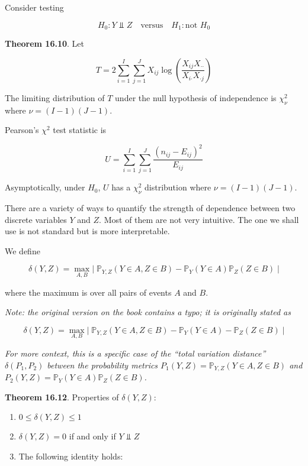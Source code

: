 Consider testing

\[
H_{0}: Y \text{ ⫫ } Z
\quad \text{versus} \quad
H_{1}: \text{not } H_{0}
\]

\textbf{Theorem 16.10}. Let

\[ T = 2 \sum_{i=1}^I \sum_{j=1}^J X_{ij} \log \left( \frac{X_{ij} X_{\text{··}}}{X_{i\text{·}} X_{\text{·}j}} \right) \]

The limiting distribution of \(T\) under the null hypothesis of
independence is \(\chi^{2}_\nu\) where \(\nu = (I - 1)(J - 1)\).

Pearson's \(\chi^{2}\) test statistic is

\[ U = \sum_{i=1}^I \sum_{j=1}^J \frac{(n_{ij} - E_{ij})^{2}}{E_{ij}}\]

Asymptotically, under \(H_{0}\), \(U\) has a \(\chi^{2}_\nu\) distribution
where \(\nu = (I - 1)(J - 1)\).

There are a variety of ways to quantify the strength of dependence
between two discrete variables \(Y\) and \(Z\). Most of them are not
very intuitive. The one we shall use is not standard but is more
interpretable.

We define

\[\delta(Y, Z) = \max_{A, B} \Big|\; \mathbb{P}_{Y, Z}(Y \in A, Z \in B) - \mathbb{P}_Y(Y \in A)\mathbb{P}_Z(Z \in B) \;\Big|\]

where the maximum is over all pairs of events \(A\) and \(B\).

\emph{Note: the original version on the book contains a typo; it is
originally stated as}

\[\delta(Y, Z) = \max_{A, B} \Big|\; \mathbb{P}_{Y, Z}(Y \in A, Z \in B) - \mathbb{P}_Y(Y \in A) - \mathbb{P}_Z(Z \in B) \;\Big|\]

\emph{For more context, this is a specific case of the ``total variation
distance'' \(\delta(P_{1}, P_{2})\) between the probability metrics
\(P_{1}(Y, Z) = \mathbb{P}_{Y, Z}(Y \in A, Z \in B)\) and
\(P_{2}(Y, Z) = \mathbb{P}_Y(Y \in A)\mathbb{P}_Z(Z \in B)\).}

\textbf{Theorem 16.12}. Properties of \(\delta(Y, Z)\):

\begin{enumerate}[tightlist,label={\arabic*.}]
\item
  \(0 \leq \delta(Y, Z) \leq 1\)
\item
  \(\delta(Y, Z) = 0\) if and only if \(Y \text{ ⫫ } Z\)
\item
  The following identity holds:
\end{enumerate}

